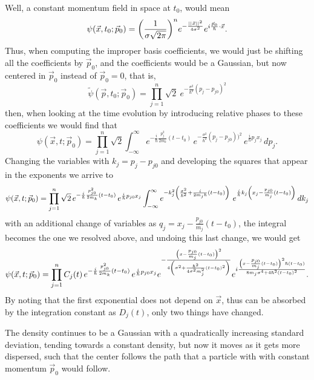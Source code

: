 \documentclass[11pt, a4paper]{article} %
\begin{document}
Well, a constant momentum field in space at $t_0$, would mean
\begin{equation}
\psi(\vec{x},t_0;\vec{p}_0)=\qty(\frac{1}{\sigma\sqrt{2\pi}})^ne^{-\frac{||\vec{x}||^2}{4\sigma^2}}e^{i\frac{\vec{p}_0}{\hbar}\cdot\vec{x}}.
\end{equation} 
Thus, when computing the improper basis coefficients, we would just be shifting all the coefficients by $\vec{p}_0$, and the coefficients would be a Gaussian, but now centered in $\vec{p}_0$ instead of $\vec{p}_0=0$, that is,
\begin{equation}
\tilde{\psi}(\vec{p},t_0;\vec{p}_0)=\prod_{j=1}^n \sqrt{2}\ e^{-\frac{\sigma^2}{\hbar^2}(p_j-p_{j0})^2}
\end{equation}
then, when looking at the time evolution by introducing relative phases to these coefficients we would find that
\begin{equation}
\psi(\vec{x},t;\vec{p}_0)=\prod_{j=1}^n\sqrt{2} \int_{-\infty}^\infty e^{-\frac{i}{\hbar} \frac{p_j^2}{2m_k}(t-t_0)}\, e^{-\frac{\sigma^2}{\hbar^2}(p_j-p_{j0}))^2} \,e^{\frac{i}{\hbar}p_jx_j}\,dp_j.
\end{equation}
Changing the variables with $k_j=p_j-p_{j0}$ and developing the squares that appear in the exponents we arrive to
\begin{equation}
\psi(\vec{x},t;\vec{p}_0)=\prod_{j=1}^n\sqrt{2}\,e^{-\frac{i}{\hbar} \frac{p_{j0}^2}{2m_k}(t-t_0)}\,e^{\frac{i}{\hbar}p_{j0}x_j} \int_{-\infty}^\infty e^{-k_j^2\qty(\frac{\sigma^2}{\hbar^2}+\frac{i}{2m_j\hbar}(t-t_0))}\, \,e^{\frac{i}{\hbar}k_j\qty(x_j-\frac{p_{j0}}{m_j}(t-t_0))}\,  dk_j
\end{equation}
with an additional change of variables as $q_j=x_j-\frac{p_{j0}}{m_j}(t-t_0)$, the integral becomes the one we resolved above, and undoing this last change, we would get
\begin{equation}
\psi(\vec{x},t;\vec{p}_0)=\prod_{j=1}^nC_j(t)\,e^{-\frac{i}{\hbar} \frac{p_{j0}^2}{2m_k}(t-t_0)}\,e^{\frac{i}{\hbar}p_{j0}x_j}e^{-\frac{\qty(x-\frac{p_{j0}}{m_j}(t-t_0))^2}{4\qty(\sigma^2+\frac{\hbar^2}{4\sigma^2m_j^2}(t-t_0)^2)}}e^{i\frac{\qty(x-\frac{p_{j0}}{m_j}(t-t_0))^2\hbar(t-t_0)}{8m_j\sigma^4+4\hbar^2(t-t_0)^2}}.
\end{equation}
By noting that the first exponential does not depend on $\vec{x}$, thus can be absorbed by the integration constant as $D_j(t)$, only two things have changed.

The density continues to be a Gaussian with a quadratically increasing standard deviation, tending towards a constant density, but now it moves as it gets more dispersed, such that the center follows the path that a particle with with constant momentum $\vec{p}_0$ would follow.
\end{document}

